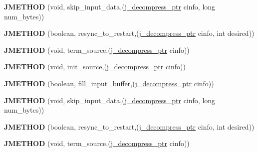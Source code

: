 \begin{DoxyCompactItemize}
{\bfseries J\+M\+E\+T\+H\+OD} (void, skip\+\_\+input\+\_\+data,(\hyperlink{structjpeg__decompress__struct}{j\+\_\+decompress\+\_\+ptr} cinfo, long num\+\_\+bytes))
\item 
\mbox{\label{structjpeg__source__mgr_a60a35ccd1fb8d954f34c0cdbf29ac010}} 
{\bfseries J\+M\+E\+T\+H\+OD} (boolean, resync\+\_\+to\+\_\+restart,(\hyperlink{structjpeg__decompress__struct}{j\+\_\+decompress\+\_\+ptr} cinfo, int desired))
\item 
\mbox{\label{structjpeg__source__mgr_a6c0683ce1166b9ee659b2d3aa1efb1c2}} 
{\bfseries J\+M\+E\+T\+H\+OD} (void, term\+\_\+source,(\hyperlink{structjpeg__decompress__struct}{j\+\_\+decompress\+\_\+ptr} cinfo))
\item 
\mbox{\label{structjpeg__source__mgr_af8fda02c19c9dc4e505daabb77c3ad81}} 
{\bfseries J\+M\+E\+T\+H\+OD} (void, init\+\_\+source,(\hyperlink{structjpeg__decompress__struct}{j\+\_\+decompress\+\_\+ptr} cinfo))
\item 
\mbox{\label{structjpeg__source__mgr_ab4a579b1f50108e2de73c7c0c1bbb9fd}} 
{\bfseries J\+M\+E\+T\+H\+OD} (boolean, fill\+\_\+input\+\_\+buffer,(\hyperlink{structjpeg__decompress__struct}{j\+\_\+decompress\+\_\+ptr} cinfo))
\item 
\mbox{\label{structjpeg__source__mgr_a3e29df8ddadb0c15e54b69b5a7a10305}} 
{\bfseries J\+M\+E\+T\+H\+OD} (void, skip\+\_\+input\+\_\+data,(\hyperlink{structjpeg__decompress__struct}{j\+\_\+decompress\+\_\+ptr} cinfo, long num\+\_\+bytes))
\item 
\mbox{\label{structjpeg__source__mgr_a60a35ccd1fb8d954f34c0cdbf29ac010}} 
{\bfseries J\+M\+E\+T\+H\+OD} (boolean, resync\+\_\+to\+\_\+restart,(\hyperlink{structjpeg__decompress__struct}{j\+\_\+decompress\+\_\+ptr} cinfo, int desired))
\item 
\mbox{\label{structjpeg__source__mgr_a6c0683ce1166b9ee659b2d3aa1efb1c2}} 
{\bfseries J\+M\+E\+T\+H\+OD} (void, term\+\_\+source,(\hyperlink{structjpeg__decompress__struct}{j\+\_\+decompress\+\_\+ptr} cinfo))
\item 
\mbox{\label{structjpeg__source__mgr_af8fda02c19c9dc4e505daabb77c3ad81}} 

\end{DoxyCompactItemize}

